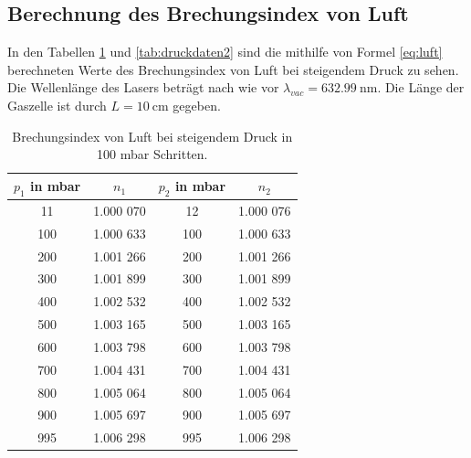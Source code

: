 \subsection{Berechnung des Brechungsindex von Luft}
In den Tabellen \ref{tab:druckdaten1} und \ref{tab:druckdaten2} sind die mithilfe von Formel \eqref{eq:luft} berechneten Werte des Brechungsindex von Luft bei steigendem Druck zu sehen.
Die Wellenlänge des Lasers beträgt nach wie vor $\lambda_{vac}=\SI{632.99}{\nano\meter}$. Die Länge der Gaszelle ist durch $L=\SI{10}{\centi\meter}$ gegeben.
\begin{table}[H]
  \center
  \caption{Brechungsindex von Luft bei steigendem Druck in 100 mbar Schritten.}
  \label{tab:druckdaten1}
 \begin{tabular}{c|c|c|c}
   $p_1$ in mbar&$n_1$ &$p_2$ in mbar &$n_2$\\
   \hline
   11  &1.000 070 & 12  & 1.000 076\\
   100 &1.000 633 & 100 & 1.000 633\\
   200 &1.001 266 & 200 & 1.001 266\\
   300 &1.001 899 & 300 & 1.001 899\\
   400 &1.002 532 & 400 & 1.002 532\\
   500 &1.003 165 & 500 & 1.003 165\\
   600 &1.003 798 & 600 & 1.003 798\\
   700 &1.004 431 & 700 & 1.004 431\\
   800 &1.005 064 & 800 & 1.005 064\\
   900 &1.005 697 & 900 & 1.005 697\\
   995 &1.006 298 & 995 & 1.006 298\\
 \end{tabular}
\end{table}

